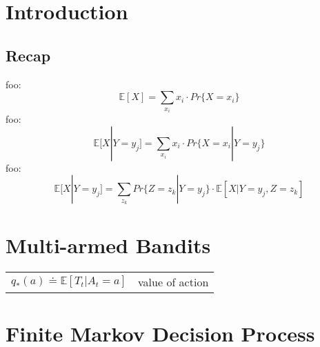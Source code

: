 \documentclass[10pt, landscape, a4paper]{article}
\begin{document}
    \begin{multicols}{3}
        \section{Introduction}

        \subsection{Recap}
        foo:
        \begin{equation}
            \mathbb{E}[X] = \sum_{x_i} x_i \cdot Pr\{ X = x_i \}
        \end{equation}
        foo:
        \begin{equation}
            \mathbb{E}[X | Y = y_j] = \sum_{x_i} x_i \cdot Pr\{ X = x_i | Y = y_j\}
        \end{equation}
        foo:
        \begin{equation}
            \mathbb{E}[X | Y = y_j] = \sum_{z_k} Pr\{Z=z_k | Y = y_j\} \cdot \mathbb{E}[X|Y = y_j, Z = z_k]
        \end{equation}


        \section{Multi-armed Bandits}
        \begin{tabular}{ p{} p{} }
            $q_{*}(a)\doteq\mathbb{E}\left[T_t|A_t=a\right]$ & value of action\\
        \end{tabular}


        \section{Finite Markov Decision Process}


\end{multicols}
\end{document}
